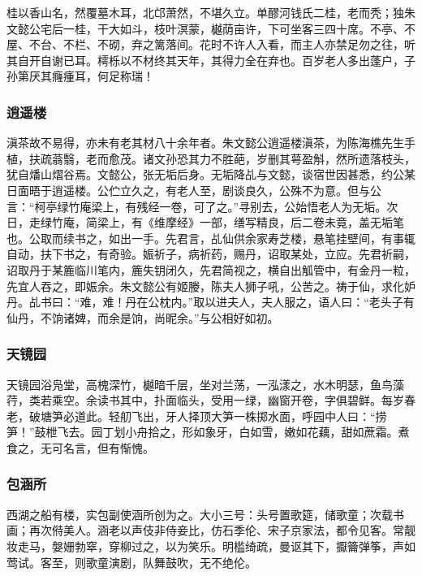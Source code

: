 \documentclass[]{article}
\begin{document}
桂以香山名，然覆墓木耳，北邙萧然，不堪久立。单醪河钱氏二桂，老而秃；独朱文懿公宅后一桂，干大如斗，枝叶溟蒙，樾荫亩许，下可坐客三四十席。不亭、不屋、不台、不栏、不砌，弃之篱落间。花时不许人入看，而主人亦禁足勿之往，听其自开自谢已耳。樗栎以不材终其天年，其得力全在弃也。百岁老人多出蓬户，子孙第厌其癃瘇耳，何足称瑞！

\hypertarget{header-n239}{%
\subsubsection{逍遥楼}\label{header-n239}}

滇茶故不易得，亦未有老其材八十余年者。朱文懿公逍遥楼滇茶，为陈海樵先生手植，扶疏蓊翳，老而愈茂。诸文孙恐其力不胜葩，岁删其萼盈斛，然所遗落枝头，犹自燔山熠谷焉。文懿公，张无垢后身。无垢降乩与文懿，谈宿世因甚悉，约公某日面晤于逍遥楼。公伫立久之，有老人至，剧谈良久，公殊不为意。但与公言：``柯亭绿竹庵梁上，有残经一卷，可了之。''寻别去，公始悟老人为无垢。次日，走绿竹庵，简梁上，有《维摩经》一部，缮写精良，后二卷未竟，盖无垢笔也。公取而续书之，如出一手。先君言，乩仙供余家寿芝楼，悬笔挂壁间，有事辄自动，扶下书之，有奇验。娠祈子，病祈药，赐丹，诏取某处，立应。先君祈嗣，诏取丹于某簏临川笔内，簏失钥闭久，先君简视之，横自出觚管中，有金丹一粒，先宜人吞之，即娠余。朱文懿公有姬媵，陈夫人狮子吼，公苦之。祷于仙，求化妒丹。乩书曰：``难，难！丹在公枕内。''取以进夫人，夫人服之，语人曰：``老头子有仙丹，不饷诸婢，而余是饷，尚昵余。''与公相好如初。

\hypertarget{header-n244}{%
\subsubsection{天镜园}\label{header-n244}}

天镜园浴凫堂，高槐深竹，樾暗千层，坐对兰荡，一泓漾之，水木明瑟，鱼鸟藻荇，类若乘空。余读书其中，扑面临头，受用一绿，幽窗开卷，字俱碧鲜。每岁春老，破塘笋必道此。轻舠飞出，牙人择顶大笋一株掷水面，呼园中人曰：``捞笋！''鼓枻飞去。园丁划小舟拾之，形如象牙，白如雪，嫩如花藕，甜如蔗霜。煮食之，无可名言，但有惭愧。

\hypertarget{header-n249}{%
\subsubsection{包涵所}\label{header-n249}}

西湖之船有楼，实包副使涵所创为之。大小三号：头号置歌筵，储歌童；次载书画；再次偫美人。涵老以声伎非侍妾比，仿石季伦、宋子京家法，都令见客。常靓妆走马，媻姗勃窣，穿柳过之，以为笑乐。明槛绮疏，曼讴其下，擫籥弹筝，声如莺试。客至，则歌童演剧，队舞鼓吹，无不绝伦。
\end{document}
